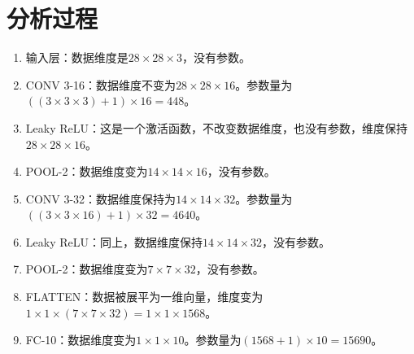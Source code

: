 \section{分析过程}\label{sec:process}

\begin{enumerate}
  \item 输入层：数据维度是$28 \times 28 \times 3$，没有参数。
  \item CONV 3-16：数据维度不变为$28 \times 28 \times 16$。参数量为$((3 \times 3 \times 3)+1) \times 16 = 448$。
  \item Leaky ReLU：这是一个激活函数，不改变数据维度，也没有参数，维度保持$28 \times 28 \times 16$。
  \item POOL-2：数据维度变为$14 \times 14 \times 16$，没有参数。
  \item CONV 3-32：数据维度保持为$14 \times 14 \times 32$。参数量为$((3 \times 3 \times 16)+1) \times 32 = 4640$。
  \item Leaky ReLU：同上，数据维度保持$14 \times 14 \times 32$，没有参数。
  \item POOL-2：数据维度变为$7 \times 7 \times 32$，没有参数。
  \item FLATTEN：数据被展平为一维向量，维度变为$1 \times 1 \times (7 \times 7 \times 32) = 1 \times 1 \times 1568$。
  \item FC-10：数据维度变为$1 \times 1 \times 10$。参数量为$(1568+1) \times 10 = 15690$。
\end{enumerate}